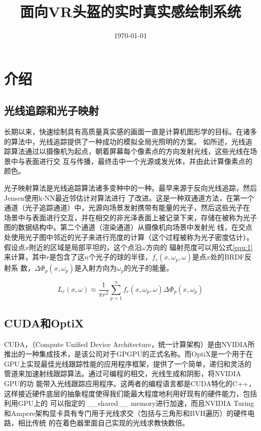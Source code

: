 \documentclass[UTF8]{ctexart}
\title{面向VR头盔的实时真实感绘制系统}
\author{}
\date{\today}
\begin{document}
\maketitle
\begin{abstract}
  
\end{abstract}


\section{介绍}
    \subsection{光线追踪和光子映射}
    长期以来，快速绘制具有高质量真实感的画面一直是计算机图形学的目标。在诸多的算法中，光线追踪提供了一种成功的模拟全局光照明的方案。
    如\cite{GlobalIllumination}所述，光线追踪算法通过以摄像机为起点，朝着屏幕每个像素点的方向发射光线，这些光线在场景中与表面进行交
    互与传播，最终击中一个光源或发光体，并由此计算像素点的颜色。
    
    光子映射算法是光线追踪算法诸多变种中的一种。最早来源于反向光线追踪\cite{ARVO1986Backward}，然后Jensen使用k-NN最近邻估计对算法进行
    了改进\cite{Jensen1996Global}。这是一种双通道方法，在第一个通道（光子追踪通道）中，光源向场景发射携带有能量的光子，然后这些光子在
    场景中与表面进行交互，并在相交的非光泽表面上被记录下来，存储在被称为光子图的数据结构中。第二个通道（渲染通道）从摄像机向场景中发射光
    线，在交点处使用光子图中邻近的光子来进行亮度的计算（这个过程被称为光子密度估计）。假设点$x$附近的区域是局部平坦的，这个点沿$\omega$方向的
    辐射亮度可以用公式\ref{equ:1}来计算，其中$r$是包含了这$n$个光子的球的半径，$f_r(x,\omega_p,\omega)$是点$x$处的BRDF反射系
    数，$\Delta\Phi_p(x,\omega_p)$是入射方向为$\omega_p$的光子的能量。
    
    \begin{equation}
    L_r(x,\omega)\approx\frac{1}{\pi r^2}\sum_{p=1}^nf_r(x,\omega_p,\omega)\Delta\Phi_p(x,\omega_p)
    \label{equ:1}
    \end{equation}
    
    \subsection{CUDA和OptiX}
    CUDA，（Compute Unified Device Architecture，统一计算架构）是由NVIDIA所推出的一种集成技术，是该公司对于GPGPU的正式名称。而OptiX是一个用于在
    GPU上实现最佳光线跟踪性能的应用程序框架，提供了一个简单，递归和灵活的管道来加速射线跟踪算法。通过可编程的相交，光线生成和阴影，将NVIDIA GPU的功
    能带入光线跟踪应用程序。这两者的编程语言都是CUDA特化的C++，这样接近硬件底层的抽象程度使得我们能最大程度地利用好现有的硬件能力，包括利用GPU上的
    可以指定的 \_\_shared\_\_ memory进行加速，而且NVIDIA Turing和Ampere架构显卡具有专门用于光线求交（包括与三角形和BVH遍历）的硬件电路，相比传统
    的在着色器里面自己实现的光线求教快数倍。
\end{document}
